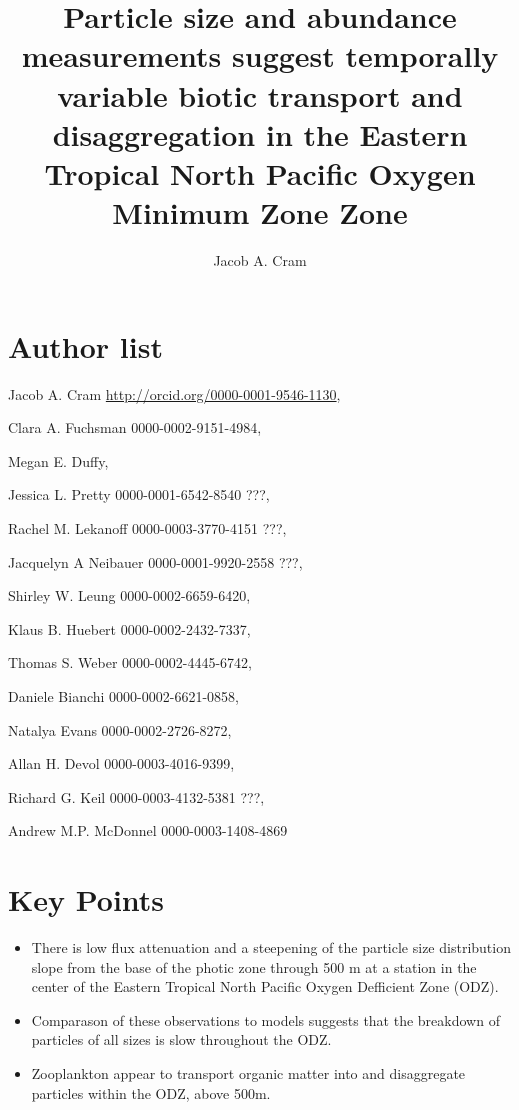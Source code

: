 \documentclass[]{article}
\title{Particle size and abundance measurements suggest temporally variable
biotic transport and disaggregation in the Eastern Tropical North
Pacific Oxygen Minimum Zone Zone}
\author{Jacob A. Cram}
\date{}
\begin{document}
\maketitle

\hypertarget{author-list}{%
\section{Author list}\label{author-list}}

Jacob A. Cram \url{http://orcid.org/0000-0001-9546-1130},

Clara A. Fuchsman 0000-0002-9151-4984,

Megan E. Duffy,

Jessica L. Pretty 0000-0001-6542-8540 ???,

Rachel M. Lekanoff 0000-0003-3770-4151 ???,

Jacquelyn A Neibauer 0000-0001-9920-2558 ???,

Shirley W. Leung 0000-0002-6659-6420,

Klaus B. Huebert 0000-0002-2432-7337,

Thomas S. Weber 0000-0002-4445-6742,

Daniele Bianchi 0000-0002-6621-0858,

Natalya Evans 0000-0002-2726-8272,

Allan H. Devol 0000-0003-4016-9399,

Richard G. Keil 0000-0003-4132-5381 ???,

Andrew M.P. McDonnel 0000-0003-1408-4869

\hypertarget{key-points}{%
\section{Key Points}\label{key-points}}

\begin{itemize}
\item
  There is low flux attenuation and a steepening of the particle size
  distribution slope from the base of the photic zone through 500 m at a
  station in the center of the Eastern Tropical North Pacific Oxygen
  Defficient Zone (ODZ).
\item
  Comparason of these observations to models suggests that the breakdown
  of particles of all sizes is slow throughout the ODZ.
\item
  Zooplankton appear to transport organic matter into and disaggregate
  particles within the ODZ, above 500m.
\end{itemize}
\end{document}
